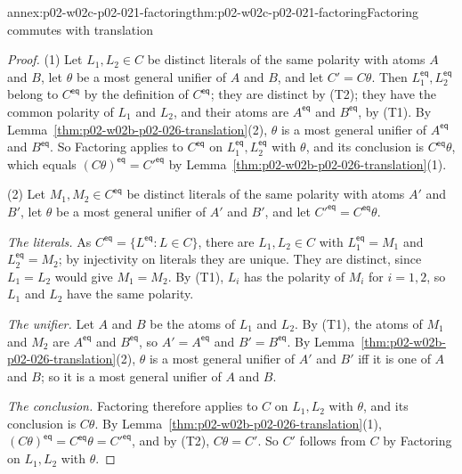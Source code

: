\begin{annexitem}{annex:p02-w02c-p02-021-factoring}{thm:p02-w02c-p02-021-factoring}{Factoring commutes with translation}
\begin{proof}
(1)  Let \(L_1,L_2\in C\) be distinct literals of the same polarity with atoms
\(A\) and \(B\), let \(\theta\) be a most general unifier of \(A\) and \(B\),
and let \(C'=C\theta\).  Then \(L_1^{\mathsf{eq}},L_2^{\mathsf{eq}}\) belong to
\(C^{\mathsf{eq}}\) by the definition of \(C^{\mathsf{eq}}\); they are
distinct by (T2); they have the common polarity of \(L_1\) and \(L_2\), and
their atoms are \(A^{\mathsf{eq}}\) and \(B^{\mathsf{eq}}\), by (T1).  By
Lemma~\ref{thm:p02-w02b-p02-026-translation}(2), \(\theta\) is a most general
unifier of \(A^{\mathsf{eq}}\) and \(B^{\mathsf{eq}}\).  So Factoring applies
to \(C^{\mathsf{eq}}\) on \(L_1^{\mathsf{eq}},L_2^{\mathsf{eq}}\) with
\(\theta\), and its conclusion is \(C^{\mathsf{eq}}\theta\), which equals
\((C\theta)^{\mathsf{eq}}=C'^{\mathsf{eq}}\) by
Lemma~\ref{thm:p02-w02b-p02-026-translation}(1).

(2)  Let \(M_1,M_2\in C^{\mathsf{eq}}\) be distinct literals of the same
polarity with atoms \(A'\) and \(B'\), let \(\theta\) be a most general
unifier of \(A'\) and \(B'\), and let \(C'^{\mathsf{eq}}=C^{\mathsf{eq}}\theta\).

\emph{The literals.}  As \(C^{\mathsf{eq}}=\{L^{\mathsf{eq}}:L\in C\}\), there
are \(L_1,L_2\in C\) with \(L_1^{\mathsf{eq}}=M_1\) and
\(L_2^{\mathsf{eq}}=M_2\); by injectivity on literals they are unique.  They
are distinct, since \(L_1=L_2\) would give \(M_1=M_2\).  By (T1), \(L_i\) has
the polarity of \(M_i\) for \(i=1,2\), so \(L_1\) and \(L_2\) have the same
polarity.

\emph{The unifier.}  Let \(A\) and \(B\) be the atoms of \(L_1\) and \(L_2\).
By (T1), the atoms of \(M_1\) and \(M_2\) are \(A^{\mathsf{eq}}\) and
\(B^{\mathsf{eq}}\), so \(A'=A^{\mathsf{eq}}\) and \(B'=B^{\mathsf{eq}}\).  By
Lemma~\ref{thm:p02-w02b-p02-026-translation}(2), \(\theta\) is a most general
unifier of \(A'\) and \(B'\) iff it is one of \(A\) and \(B\); so it is a most
general unifier of \(A\) and \(B\).

\emph{The conclusion.}  Factoring therefore applies to \(C\) on \(L_1,L_2\)
with \(\theta\), and its conclusion is \(C\theta\).  By
Lemma~\ref{thm:p02-w02b-p02-026-translation}(1),
\((C\theta)^{\mathsf{eq}}=C^{\mathsf{eq}}\theta=C'^{\mathsf{eq}}\), and by
(T2), \(C\theta=C'\).  So \(C'\) follows from \(C\) by Factoring on
\(L_1,L_2\) with \(\theta\).


\end{proof}
\end{annexitem}
